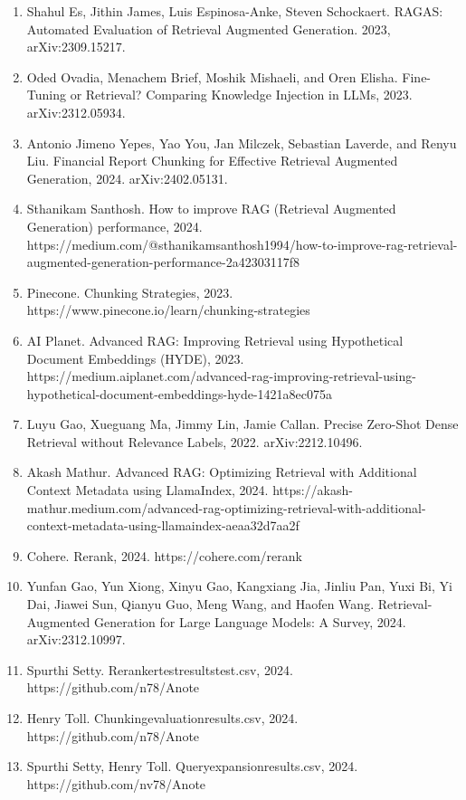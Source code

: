 \documentclass{article}
\begin{document}
\small
\begin{enumerate}
    
    
    \item Shahul Es, Jithin James, Luis Espinosa-Anke, Steven Schockaert. RAGAS: Automated Evaluation of Retrieval Augmented Generation. 2023, arXiv:2309.15217.

   \item Oded Ovadia, Menachem Brief, Moshik Mishaeli, and Oren Elisha.
    Fine-Tuning or Retrieval? Comparing Knowledge Injection in LLMs, 2023. arXiv:2312.05934.

   \item Antonio Jimeno Yepes, Yao You, Jan Milczek, Sebastian Laverde, and Renyu Liu. Financial Report Chunking for Effective Retrieval Augmented Generation, 2024. arXiv:2402.05131.
    
    \item Sthanikam Santhosh. How to improve RAG (Retrieval Augmented Generation) performance, 2024. https://medium.com/@sthanikamsanthosh1994/how-to-improve-rag-retrieval-augmented-generation-performance-2a42303117f8

    \noindent \item Pinecone. Chunking Strategies, 2023.
    https://www.pinecone.io/learn/chunking-strategies
    
     \item AI Planet. Advanced RAG: Improving Retrieval using Hypothetical Document Embeddings (HYDE), 2023.  
     https://medium.aiplanet.com/advanced-rag-improving-retrieval-using-hypothetical-document-embeddings-hyde-1421a8ec075a

     \item Luyu Gao, Xueguang Ma, Jimmy Lin, Jamie Callan. Precise Zero-Shot Dense Retrieval without Relevance Labels, 2022. arXiv:2212.10496.

    \item Akash Mathur. Advanced RAG: Optimizing Retrieval with Additional Context Metadata using LlamaIndex, 2024.
    https://akash-mathur.medium.com/advanced-rag-optimizing-retrieval-with-additional-context-metadata-using-llamaindex-aeaa32d7aa2f
    
     \item Cohere. Rerank, 2024. https://cohere.com/rerank

    \item  Yunfan Gao, Yun Xiong, Xinyu Gao, Kangxiang Jia, Jinliu Pan, Yuxi Bi, Yi Dai, Jiawei Sun, Qianyu Guo, Meng Wang, and Haofen Wang. Retrieval-Augmented Generation for Large Language Models: A Survey, 2024. arXiv:2312.10997.

    \item Spurthi Setty. Rerankertestresultstest.csv, 2024. https://github.com/n78/Anote

    \item Henry Toll. Chunkingevaluationresults.csv, 2024. https://github.com/n78/Anote

    \item Spurthi Setty, Henry Toll. Queryexpansionresults.csv, 2024. https://github.com/nv78/Anote

\end{enumerate}
\end{document}
